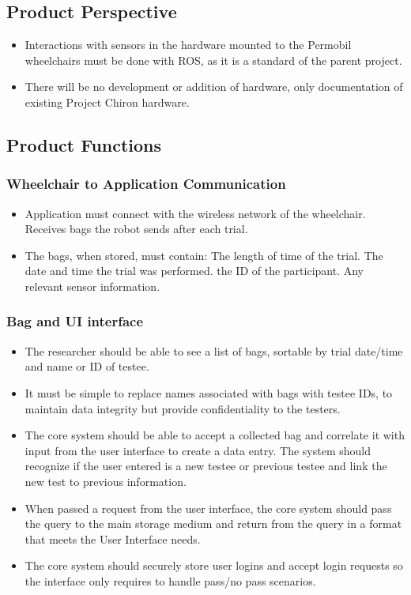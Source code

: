 \documentclass[onecolumn, draftclsnofoot,10pt, compsoc]{IEEEtran}
\begin{document}
\subsection{Product Perspective}
\begin{itemize}
	\item Interactions with sensors in the hardware mounted to the Permobil wheelchairs must be done with ROS, as it is a standard of the parent project.
	\item There will be no development or addition of hardware, only documentation of existing Project Chiron hardware.
\end{itemize}
\subsection{Product Functions}
\subsubsection{Wheelchair to Application Communication}
\begin{itemize}
	\item Application must connect with the wireless network of the wheelchair.
	\subitem Receives bags the robot sends after each trial.
	\item The bags, when stored, must contain:
	\subitem The length of time of the trial.
	\subitem The date and time the trial was performed.
	\subitem the ID of the participant.
	\subitem Any relevant sensor information.
\end{itemize}
\subsubsection{Bag and UI interface}
\begin{itemize}
	\item The researcher should be able to see a list of bags, sortable by trial date/time and name or ID of testee.
	\item It must be simple to replace names associated with bags with testee IDs, to maintain data integrity but provide confidentiality to the testers.
	\item The core system should be able to accept a collected bag and correlate it with input from the user interface to create a data entry.
	\subitem The system should recognize if the user entered is a new testee or previous testee and link the new test to previous information.
	\item When passed a request from the user interface, the core system should pass the query to the main storage medium and return from the query in a format that meets the User Interface needs.
	\item The core system should securely store user logins and accept login requests so the interface only requires to handle pass/no pass scenarios.
\end{itemize}
\end{document}
